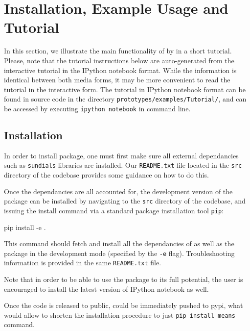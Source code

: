 \section{Installation, Example Usage and Tutorial} \label{examples}
In this section, we illustrate the main functionality of \means{} by in a short tutorial.
Please, note that the tutorial instructions below are auto-generated from the interactive tutorial in the IPython notebook format. 
While the information is identical between both media forms, it may be more convenient to read the tutorial in the interactive form. 
The tutorial in  IPython notebook format can be found in \means{} source code in the directory  \verb"prototypes/examples/Tutorial/", and can be accessed by executing \texttt{ipython notebook} in command line.

\subsection{Installation}

In order to install \means{} package, one must first make sure all external dependancies such as \verb"sundials" libraries  are installed. 
Our \verb"README.txt" file located in the \verb"src" directory of the codebase provides some guidance on how to do this.

Once the dependancies are all accounted for, the development version of the \means{} package can be installed by navigating to the \verb"src" directory of the codebase, and issuing the install command via a standard \py{} package installation tool \verb"pip":

\begin{InputVerbatim}
pip install -e .
\end{InputVerbatim}

This command should fetch and install all the dependancies of \means{} as well as the package in the development mode (specified by the \verb"-e" flag). 
Troubleshooting information is provided in the same \verb"README.txt" file.

Note that in order to be able to use the \means{} package to its full potential, the user is encouraged to install the latest version of  IPython notebook\cite{perez_ipython:_2007} as well.

Once the code is released to public, \means{} could be immediately pushed to \gls{pypi}, what would allow to shorten the installation procedure to just \verb"pip install means" command.

